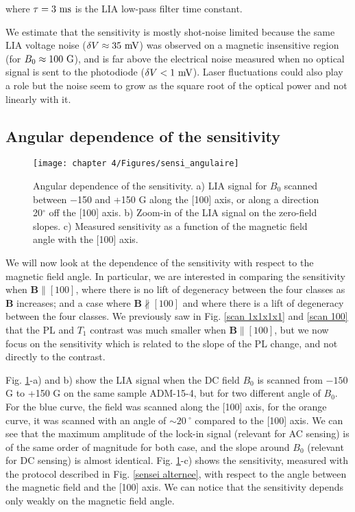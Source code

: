 \documentclass[a4paper,11pt]{report}
\begin{document}
\begin{refsection}
where $\tau=3\ \rm ms$ is the LIA low-pass filter time constant. 

We estimate that the sensitivity is mostly shot-noise limited because the same LIA voltage noise ($\delta V \approx 35\ \rm mV$) was observed on a magnetic insensitive region (for $B_0 \approx 100\ \rm G$), and is far above the electrical noise measured when no optical signal is sent to the photodiode ($\delta V < 1\ \rm mV$). Laser fluctuations could also play a role but the noise seem to grow as the square root of the optical power and not linearly with it.

\subsection{Angular dependence of the sensitivity}
\label{sec angular sensi}
\begin{figure}[h!]
\centering
\texttt{[image: chapter 4/Figures/sensi\_angulaire]}
\caption{Angular dependence of the sensitivity. a) LIA signal for $B_0$ scanned between $-$150 and +150 G along the [100] axis, or along a direction 20$^\circ$ off the [100] axis. b) Zoom-in of the LIA signal on the zero-field slopes. c) Measured sensitivity as a function of the magnetic field angle with the [100] axis.}
\label{angular sensi}
\end{figure}

We will now look at the dependence of the sensitivity with respect to the magnetic field angle. In particular, we are interested in comparing the sensitivity when $\mathbf{B}\parallel [100]$, where there is no lift of degeneracy between the four classes as $\mathbf{B}$ increases; and a case where $\mathbf{B}\nparallel [100]$ and where there is a lift of degeneracy between the four classes. We previously saw in Fig. \ref{scan 1x1x1x1} and \ref{scan 100} that the PL and $T_1$ contrast was much smaller when $\mathbf{B}\parallel [100]$, but we now focus on the sensitivity which is related to the slope of the PL change, and not directly to the contrast.

Fig. \ref{angular sensi}-a) and b) show the LIA signal when the DC field $B_0$ is scanned from $-150$ G to +150 G on the same sample ADM-15-4, but for two different angle of $B_0$. For the blue curve, the field was scanned along the [100] axis, for the orange curve, it was scanned with an angle of $\sim 20\ ^\circ$ compared to the [100] axis. We can see that the maximum amplitude of the lock-in signal (relevant for AC sensing) is of the same order of magnitude for both case, and the slope around $B_0$ (relevant for DC sensing) is almost identical. Fig. \ref{angular sensi}-c) shows the sensitivity, measured with the protocol described in Fig. \ref{sensei alternee}, with respect to the angle between the magnetic field and the [100] axis. We can notice that the sensitivity depends only weakly on the magnetic field angle. 


\end{refsection}
\end{document}
